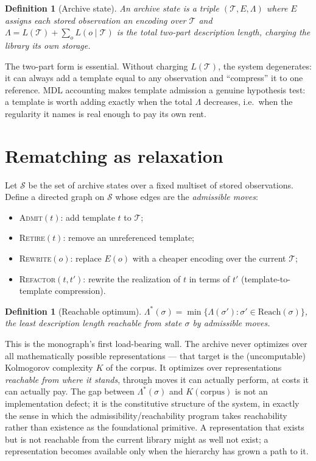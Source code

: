 \documentclass[11pt,oneside]{book}
\newtheorem{definition}[theorem]{Definition}
\theoremstyle{remark}
\newcommand{\Tem}{\mathcal{T}}
\newcommand{\Reach}{\mathrm{Reach}}
\newcommand{\Kol}{K}
\begin{document}
\begin{definition}[Archive state]
An archive state is a triple $(\Tem, E, \Lambda)$ where $E$ assigns each
stored observation an encoding over $\Tem$ and
$\Lambda = L(\Tem) + \sum_{o} L(o \mid \Tem)$
is the total two-part description length, charging the library its own
storage.
\end{definition}

The two-part form is essential. Without charging $L(\Tem)$, the system
degenerates: it can always add a template equal to any observation and
``compress'' it to one reference. MDL accounting makes template
admission a genuine hypothesis test: a template is worth adding exactly
when the total $\Lambda$ decreases, i.e.\ when the regularity it names
is real enough to pay its own rent.

\section{Rematching as relaxation}

Let $\mathcal{S}$ be the set of archive states over a fixed multiset of
stored observations. Define a directed graph on $\mathcal{S}$ whose
edges are the \emph{admissible moves}:

\begin{itemize}[leftmargin=2em]
\item \textsc{Admit}$(t)$: add template $t$ to $\Tem$;
\item \textsc{Retire}$(t)$: remove an unreferenced template;
\item \textsc{Rewrite}$(o)$: replace $E(o)$ with a cheaper encoding over
the current $\Tem$;
\item \textsc{Refactor}$(t, t')$: rewrite the realization of $t$ in
terms of $t'$ (template-to-template compression).
\end{itemize}

\begin{definition}[Reachable optimum]
$\Lambda^\ast(\sigma) = \min \{\Lambda(\sigma') : \sigma' \in
\Reach(\sigma)\}$, the least description length reachable from state
$\sigma$ by admissible moves.
\end{definition}

This is the monograph's first load-bearing wall. The archive never
optimizes over all mathematically possible representations --- that
target is the (uncomputable) Kolmogorov complexity $\Kol$ of the corpus.
It optimizes over representations \emph{reachable from where it stands},
through moves it can actually perform, at costs it can actually pay. The
gap between $\Lambda^\ast(\sigma)$ and $\Kol(\text{corpus})$ is not an
implementation defect; it is the constitutive structure of the system,
in exactly the sense in which the admissibility/reachability program
takes reachability rather than existence as the foundational primitive.
A representation that exists but is not reachable from the current
library might as well not exist; a representation becomes available only
when the hierarchy has grown a path to it.
\end{document}
